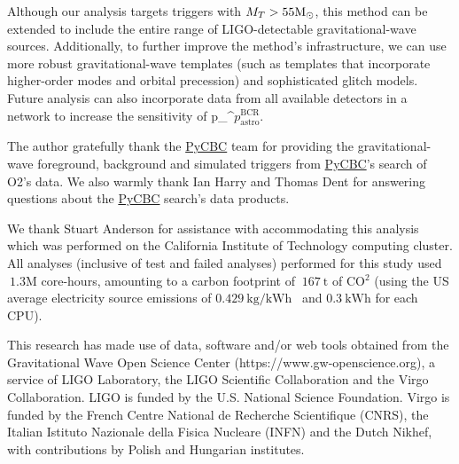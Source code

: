 \documentclass[%
 nofootinbib,
 amsmath,amssymb,
 aps,
 twocolumn,
 superscriptaddress
]{revtex4-2}
\newcommand{\pycbc}{{\sc \href{https://pycbc.org/}{{PyCBC}}}\xspace}
\newcommand{\fancytext}[1]{{\relax\ifmmode#1\else $#1$\fi}\xspace}
\newcommand{\mathcmd}[1]{{\sc \relax\ifmmode#1\else $#1$\fi}\xspace}
\newcommand{\msun}{\mathcmd{\text{M}_\odot}}
\newcommand{\pastrobcr}{\fancytext{p_\text{astro}^{\text{BCR}}}}
\newcommand{\avi}[1]{\textcolor{orange}{[AV: #1]}}
\newcommand{\greg}[1]{\textcolor{purple}{[Greg: #1]}}
\begin{document}
Although our analysis targets triggers with $M_T > 55 \msun$, this method can be extended to include the entire range of LIGO-detectable gravitational-wave sources. Additionally, to further improve the method's infrastructure, we can use more robust gravitational-wave templates (such as templates that incorporate higher-order modes and orbital precession) and sophisticated glitch models. Future analysis can also incorporate data from all available detectors in a network to increase the sensitivity of \pastrobcr. 





\begin{acknowledgments}

The author gratefully thank the \pycbc team for providing the gravitational-wave foreground, background and simulated triggers from \pycbc's search of O2's data. We also warmly thank Ian Harry and Thomas Dent for answering questions about the \pycbc search's data products.  

We thank Stuart Anderson for assistance with accommodating this analysis which was performed on the California Institute of Technology computing cluster. All analyses (inclusive of test and failed analyses) performed for this study used $~1.3\mathrm{M}$ core-hours, amounting to a carbon footprint of $~167\ \mathrm{t}$ of CO$^2$ (using the US average electricity source emissions of $0.429\ \text{kg/kWh}$~\cite{greenhouse} and $0.3\ \text{kWh}$ for each CPU).

This research has made use of data, software and/or web tools obtained from the Gravitational Wave Open Science Center (https://www.gw-openscience.org), a service of LIGO Laboratory, the LIGO Scientific Collaboration and the Virgo Collaboration. LIGO is funded by the U.S. National Science Foundation. Virgo is funded by the French Centre National de Recherche Scientifique (CNRS), the Italian Istituto Nazionale della Fisica Nucleare (INFN) and the Dutch Nikhef, with contributions by Polish and Hungarian institutes.


\end{acknowledgments}
\end{document}
